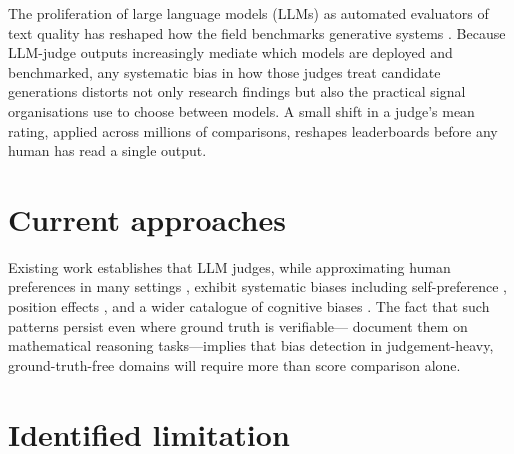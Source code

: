 \documentclass[sigconf,authoryear,nonacm,natbib=false]{acmart}
\begin{document}
The proliferation of large language models (LLMs) as automated evaluators
of text quality has reshaped how the field benchmarks generative systems
\citep{zheng2023judging}. Because LLM-judge outputs increasingly mediate
which models are deployed and benchmarked, any systematic bias in how those
judges treat candidate generations distorts not only research findings but
also the practical signal organisations use to choose between models. A
small shift in a judge's mean rating, applied across millions of
comparisons, reshapes leaderboards before any human has read a single
output.

\section{Current approaches}
\label{sec:current}


Existing work establishes that LLM judges, while approximating human
preferences in many settings \citep{zheng2023judging}, exhibit systematic
biases including self-preference \citep{panickssery2024llm,
wataoka2024selfpreference, chen2025do}, position effects
\citep{wang2023large}, and a wider catalogue of cognitive biases
\citep{koo2024benchmarking}. The fact that such patterns persist even where
ground truth is verifiable---\citet{stephan2024from} document them on
mathematical reasoning tasks---implies that bias detection in
judgement-heavy, ground-truth-free domains will require more than score
comparison alone.

\section{Identified limitation}
\label{sec:limitation}

\end{document}

